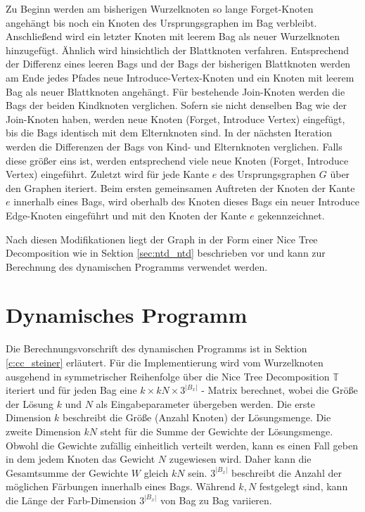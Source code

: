 Zu Beginn werden am bisherigen Wurzelknoten so lange \glqq Forget\grqq -Knoten angehängt bis noch ein Knoten des Ursprungsgraphen im Bag verbleibt. 
Anschließend wird ein letzter Knoten mit leerem Bag als neuer Wurzelknoten hinzugefügt. 
Ähnlich wird hinsichtlich der Blattknoten verfahren. 
Entsprechend der Differenz eines leeren Bags und der Bags der bisherigen Blattknoten werden am Ende jedes Pfades neue \glqq Introduce-Vertex\grqq -Knoten und ein Knoten mit leerem Bag als neuer Blattknoten angehängt. 
Für bestehende \glqq Join\grqq -Knoten werden die Bags der beiden Kindknoten verglichen. 
Sofern sie nicht denselben Bag wie der \glqq Join\grqq -Knoten haben, werden neue Knoten (\glqq Forget\grqq , \glqq Introduce Vertex\grqq ) eingefügt, bis die Bags identisch mit dem Elternknoten sind. 
In der nächsten Iteration werden die Differenzen der Bags von Kind- und Elternknoten verglichen. 
Falls diese größer eins ist, werden entsprechend viele neue Knoten (\glqq Forget\grqq , \glqq Introduce Vertex\grqq ) eingeführt.
Zuletzt wird für jede Kante $e$ des Ursprungsgraphen $G$ über den Graphen iteriert. 
Beim ersten gemeinsamen Auftreten der Knoten der Kante $e$ innerhalb eines Bags, wird oberhalb des Knoten dieses Bags ein neuer \glqq Introduce Edge\grqq -Knoten eingeführt und mit den Knoten der Kante $e$ gekennzeichnet.

Nach diesen Modifikationen liegt der Graph in der Form einer Nice Tree Decomposition wie in Sektion \ref{sec:ntd_ntd} beschrieben vor und kann zur Berechnung des dynamischen Programms verwendet werden.

\section{Dynamisches Programm}
\label{sec:impl_dynP}
Die Berechnungsvorschrift des dynamischen Programms ist in Sektion \ref{c:cc_steiner} erläutert. 
Für die Implementierung wird vom Wurzelknoten ausgehend in symmetrischer Reihenfolge über die Nice Tree Decomposition $\mathbb{T}$ iteriert und für jeden Bag eine $k \times kN \times 3^{|B_x|}$ - Matrix berechnet, wobei die Größe der Lösung $k$ und $N$ als Eingabeparameter übergeben werden. 
Die erste Dimension $k$ beschreibt die Größe (Anzahl Knoten) der Lösungsmenge. 
Die zweite Dimension $kN$ steht für die Summe der Gewichte der Lösungsmenge. 
Obwohl die Gewichte zufällig einheitlich verteilt werden, kann es einen Fall geben in dem jedem Knoten das Gewicht $N$ zugewiesen wird. 
Daher kann die Gesamtsumme der Gewichte $W$ gleich $kN$ sein.
$3^{|B_x|}$ beschreibt die Anzahl der möglichen Färbungen innerhalb eines Bags. 
Während $k,N$ festgelegt sind, kann die Länge der Farb-Dimension $3^{|B_x|}$ von Bag zu Bag variieren. 
